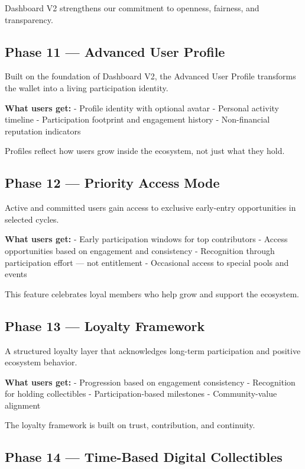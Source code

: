\documentclass[
  10pt,
  letterpaper,
]{article}
\begin{document}
Dashboard V2 strengthens our commitment to openness, fairness, and
transparency.

\subsection{Phase 11 --- Advanced User
Profile}\label{phase-11-advanced-user-profile}

Built on the foundation of Dashboard V2, the Advanced User Profile
transforms the wallet into a living participation identity.

\textbf{What users get:} - Profile identity with optional avatar -
Personal activity timeline - Participation footprint and engagement
history - Non-financial reputation indicators

Profiles reflect how users grow inside the ecosystem, not just what they
hold.

\subsection{Phase 12 --- Priority Access
Mode}\label{phase-12-priority-access-mode}

Active and committed users gain access to exclusive early-entry
opportunities in selected cycles.

\textbf{What users get:} - Early participation windows for top
contributors - Access opportunities based on engagement and consistency
- Recognition through participation effort --- not entitlement -
Occasional access to special pools and events

This feature celebrates loyal members who help grow and support the
ecosystem.

\subsection{Phase 13 --- Loyalty
Framework}\label{phase-13-loyalty-framework}

A structured loyalty layer that acknowledges long-term participation and
positive ecosystem behavior.

\textbf{What users get:} - Progression based on engagement consistency -
Recognition for holding collectibles - Participation-based milestones -
Community-value alignment

The loyalty framework is built on trust, contribution, and continuity.

\subsection{Phase 14 --- Time-Based Digital
Collectibles}\label{phase-14-time-based-digital-collectibles}
\end{document}
